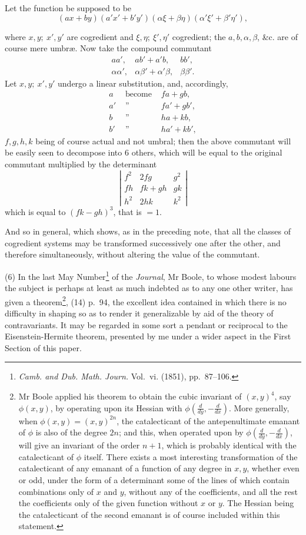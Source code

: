 \documentclass[11pt]{article}
\newcommand{\sourcepage}[1]{\marginpar{\scriptsize p.~#1}}
\begin{document}
Let the function be supposed to be
\[
(ax+by)(a'x'+b'y')(\alpha\xi+\beta\eta)(\alpha'\xi'+\beta'\eta'),
\]

\sourcepage{325}
where $x,y;\ x',y'$ are cogredient and $\xi,\eta;\ \xi',\eta'$ cogredient; the $a,b,\alpha,\beta$, \&c. are of course mere umbræ. Now take the compound commutant
\[
\begin{array}{ccc}
aa',&ab'+a'b,&bb',\\
\alpha\alpha',&\alpha\beta'+\alpha'\beta,&\beta\beta'.
\end{array}
\]
Let $x,y;\ x',y'$ undergo a linear substitution, and, accordingly,
\[
\begin{array}{rcl}
a&\text{ become }&fa+gb,\\
a'&\text{ '' }&fa'+gb',\\
b&\text{ '' }&ha+kb,\\
b'&\text{ '' }&ha'+kb',
\end{array}
\]
$f,g,h,k$ being of course actual and not umbral; then the above commutant will be easily seen to decompose into 6 others, which will be equal to the original commutant multiplied by the determinant
\[
\left|\begin{array}{ccc}
f^2&2fg&g^2\\
fh&fk+gh&gk\\
h^2&2hk&k^2
\end{array}\right|
\]
which is equal to $(fk-gh)^3$, that is $=1$.

And so in general, which shows, as in the preceding note, that all the classes of cogredient systems may be transformed successively one after the other, and therefore simultaneously, without altering the value of the commutant.

(6) In the last May Number\footnote{\emph{Camb. and Dub. Math. Journ.} Vol.~vi. (1851), pp.~87--106.} of the \emph{Journal}, Mr Boole, to whose modest labours the subject is perhaps at least as much indebted as to any one other writer, has given a theorem\footnote{Mr Boole applied his theorem to obtain the cubic invariant of $(x,y)^4$, say $\phi(x,y)$, by operating upon its Hessian with $\phi\left(\frac{d}{dy},-\frac{d}{dx}\right)$. More generally, when $\phi(x,y)=(x,y)^{2n}$, the catalecticant of the antepenultimate emanant of $\phi$ is also of the degree $2n$; and this, when operated upon by $\phi\left(\frac{d}{dy},-\frac{d}{dx}\right)$, will give an invariant of the order $n+1$, which is probably identical with the catalecticant of $\phi$ itself. There exists a most interesting transformation of the catalecticant of any emanant of a function of any degree in $x,y$, whether even or odd, under the form of a determinant some of the lines of which contain combinations only of $x$ and $y$, without any of the coefficients, and all the rest the coefficients only of the given function without $x$ or $y$. The Hessian being the catalecticant of the second emanant is of course included within this statement.}, (14) p.~94, the excellent idea contained in which there is no difficulty in shaping so as to render it generalizable by aid of the theory of contravariants. It may be regarded in some sort a pendant or reciprocal to the Eisenstein-Hermite theorem, presented by me under a wider aspect in the First Section of this paper.
\end{document}
